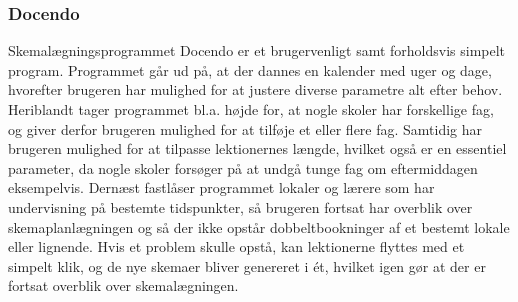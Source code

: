 \subsubsection{Docendo}
Skemalægningsprogrammet Docendo er et brugervenligt samt forholdsvis simpelt program. Programmet går ud på, at der dannes en kalender med uger og dage, hvorefter brugeren har mulighed for at justere diverse parametre alt efter behov. Heriblandt tager programmet bl.a. højde for, at nogle skoler har forskellige fag, og giver derfor brugeren mulighed for at tilføje et eller flere fag. Samtidig har brugeren mulighed for at tilpasse lektionernes længde, hvilket også er en essentiel parameter, da nogle skoler forsøger på at undgå tunge fag om eftermiddagen eksempelvis. Dernæst fastlåser programmet lokaler og lærere som har undervisning på bestemte tidspunkter, så brugeren fortsat har overblik over skemaplanlægningen og så der ikke opstår dobbeltbookninger af et bestemt lokale eller lignende. Hvis et problem skulle opstå, kan lektionerne flyttes med et simpelt klik, og de nye skemaer bliver genereret i ét, hvilket igen gør at der er fortsat overblik over skemalægningen.
